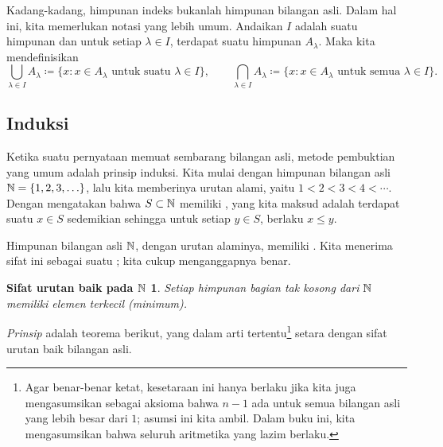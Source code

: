 Kadang-kadang, himpunan indeks bukanlah himpunan bilangan asli.  Dalam hal ini,
kita memerlukan notasi yang lebih umum.  Andaikan $I$ adalah suatu himpunan dan
untuk setiap $\lambda \in I$, terdapat suatu himpunan $A_\lambda$.  Maka kita
mendefinisikan
\begin{equation*}
\bigcup_{\lambda \in I} A_\lambda \coloneqq \{ x : x \in A_\lambda \text{ untuk suatu }
\lambda \in I
\} ,
\qquad
\bigcap_{\lambda \in I} A_\lambda \coloneqq \{ x : x \in A_\lambda \text{ untuk semua }
\lambda \in I
\} .
\end{equation*}

\subsection{Induksi}

Ketika suatu pernyataan memuat sembarang bilangan asli,
metode pembuktian yang umum adalah prinsip induksi.
Kita mulai dengan himpunan bilangan asli ${\mathbb{N}} = \{ 1,2,3,\ldots \}$, lalu kita
memberinya urutan alami,
yaitu $1 < 2 < 3 < 4 < \cdots$.
Dengan mengatakan bahwa $S \subset {\mathbb{N}}$ memiliki
\emph{}, yang kita maksud adalah terdapat suatu
$x \in S$ sedemikian sehingga untuk setiap
$y \in S$, berlaku $x \leq y$.

Himpunan bilangan asli ${\mathbb{N}}$, dengan urutan alaminya,
memiliki \emph{}.
Kita menerima sifat ini
sebagai suatu ; kita cukup menganggapnya benar.

\theoremstyle{plain}
\newtheorem*{wellordprop}{Sifat urutan baik pada ${\mathbb{N}}$}
\hypertarget{wop:link}{}%
\begin{wellordprop}
Setiap himpunan bagian tak kosong dari ${\mathbb{N}}$ memiliki elemen terkecil (minimum).
\end{wellordprop}

\emph{Prinsip } adalah
teorema berikut, yang dalam arti tertentu\footnote{Agar benar-benar
ketat, kesetaraan ini hanya berlaku jika kita
juga mengasumsikan sebagai aksioma bahwa $n-1$ ada untuk semua bilangan asli
yang lebih besar dari $1$; asumsi ini kita ambil.  Dalam buku ini, kita
mengasumsikan bahwa seluruh aritmetika yang lazim berlaku.}
setara dengan sifat urutan baik bilangan asli.

